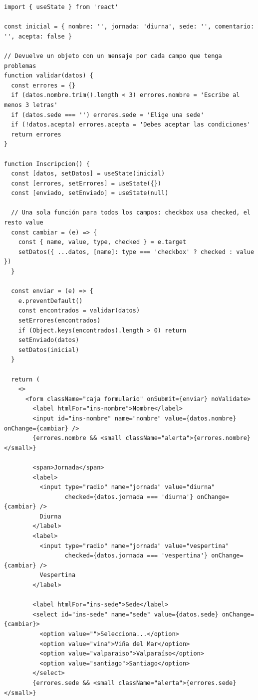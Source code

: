 \documentclass[11pt,a4paper]{article}
\begin{document}
\begin{lstlisting}[language=JSX,title={\small\ttfamily src/components/formularios/Inscripcion.jsx}]
import { useState } from 'react'

const inicial = { nombre: '', jornada: 'diurna', sede: '', comentario: '', acepta: false }

// Devuelve un objeto con un mensaje por cada campo que tenga problemas
function validar(datos) {
  const errores = {}
  if (datos.nombre.trim().length < 3) errores.nombre = 'Escribe al menos 3 letras'
  if (datos.sede === '') errores.sede = 'Elige una sede'
  if (!datos.acepta) errores.acepta = 'Debes aceptar las condiciones'
  return errores
}

function Inscripcion() {
  const [datos, setDatos] = useState(inicial)
  const [errores, setErrores] = useState({})
  const [enviado, setEnviado] = useState(null)

  // Una sola función para todos los campos: checkbox usa checked, el resto value
  const cambiar = (e) => {
    const { name, value, type, checked } = e.target
    setDatos({ ...datos, [name]: type === 'checkbox' ? checked : value })
  }

  const enviar = (e) => {
    e.preventDefault()
    const encontrados = validar(datos)
    setErrores(encontrados)
    if (Object.keys(encontrados).length > 0) return
    setEnviado(datos)
    setDatos(inicial)
  }

  return (
    <>
      <form className="caja formulario" onSubmit={enviar} noValidate>
        <label htmlFor="ins-nombre">Nombre</label>
        <input id="ins-nombre" name="nombre" value={datos.nombre} onChange={cambiar} />
        {errores.nombre && <small className="alerta">{errores.nombre}</small>}

        <span>Jornada</span>
        <label>
          <input type="radio" name="jornada" value="diurna"
                 checked={datos.jornada === 'diurna'} onChange={cambiar} />
          Diurna
        </label>
        <label>
          <input type="radio" name="jornada" value="vespertina"
                 checked={datos.jornada === 'vespertina'} onChange={cambiar} />
          Vespertina
        </label>

        <label htmlFor="ins-sede">Sede</label>
        <select id="ins-sede" name="sede" value={datos.sede} onChange={cambiar}>
          <option value="">Selecciona...</option>
          <option value="vina">Viña del Mar</option>
          <option value="valparaiso">Valparaíso</option>
          <option value="santiago">Santiago</option>
        </select>
        {errores.sede && <small className="alerta">{errores.sede}</small>}


\end{lstlisting}
\end{document}

